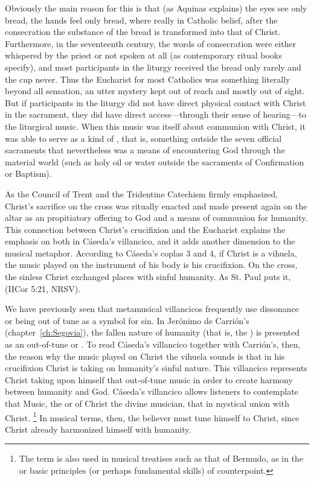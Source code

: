 Obviously the main reason for this is that (as Aquinas explains) the eyes see only bread, the hands feel only bread, where really in Catholic belief, after the consecration the substance of the bread is transformed into that of Christ.
Furthermore, in the seventeenth century, the words of consecration were either whispered by the priest or not spoken at all (as contemporary ritual books specify), and most participants in the liturgy received the bread only rarely and the cup never.
Thus the Eucharist for most Catholics was something literally beyond all sensation, an utter mystery kept out of reach and mostly out of sight.
But if participants in the liturgy did not have direct physical contact with Christ in the sacrament, they did have direct access---through their sense of hearing---to the liturgical music.
When this music was itself about communion with Christ, it was able to serve as a kind of , that is, something outside the seven official sacraments that nevertheless was a means of encountering God through the material world (such as holy oil or water outside the sacraments of Confirmation or Baptism).

As the Council of Trent and the Tridentine Catechism firmly emphasized, Christ's sacrifice on the cross was ritually enacted and made present again on the altar as an propitiatory offering to God and a means of communion for humanity. 
This connection between Christ's crucifixion and the Eucharist explains the emphasis on both in Cáseda's villancico, and it adds another dimension to the musical metaphor.
According to Cáseda's coplas 3 and 4, if Christ is a vihuela, the music played on the instrument of his body is his crucifixion.
On the cross, the sinless Christ exchanged places with sinful humanity.
As St. Paul puts it,  (IICor 5:21, NRSV).

We have previously seen that metamusical villancicos frequently use dissonance or being out of tune as a symbol for sin. 
In Jerónimo de Carrión's  (chapter~\ref{ch:Segovia}), the fallen nature of humanity (that is, the ) is presented as an out-of-tune or . 
To read Cáseda's villancico together with Carrión's, then, the reason why the music played on Christ the vihuela sounds  is that in his crucifixion Christ is taking on humanity's sinful nature.
This villancico represents Christ taking upon himself that out-of-tune music in order to create harmony between humanity and God.
Cáseda's villancico allows listeners to contemplate that Music, the  or  of Christ the divine musician, that  in mystical union with Christ.%
	\footnote{%
	The term  is also used in musical treatises such as that of Bermudo, as in the  or basic principles (or perhaps fundamental skills) of counterpoint.
	}
In musical terms, then, the believer must tune himself to Christ, since Christ already harmonized himself with humanity.

